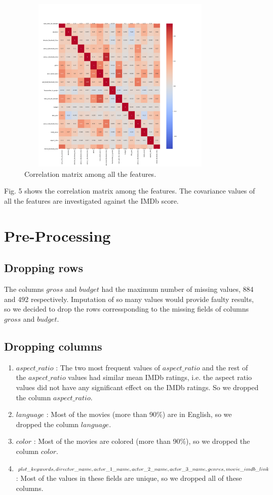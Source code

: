 \documentclass[conference]{IEEEtran}
\begin{document}
\begin{figure}[H]
  \centering	
  \captionsetup{justification=centering}
  \includegraphics[height=8.5cm, width=10cm, trim={20mm 20mm 20mm 40mm},clip]{../visualizations/corr_matrix.png}
  \caption{Correlation matrix among all the features.}
  \label{fig:fig5}
\end{figure}
Fig. 5 shows the correlation matrix among the features. The covariance values of all the features are investigated against the IMDb score.

\newpage
\section{Pre-Processing}
\subsection{Dropping rows}
The columns $gross$ and $budget$ had the maximum number of missing values, 884 and 492 respectively. Imputation of so many values would provide faulty results, so we decided to drop the rows corressponding to the missing fields of columns $gross$ and $budget$.
\subsection{Dropping columns}
	\begin{enumerate}
		\item $aspect\_ratio$ : The two most frequent values of $aspect\_ratio			$ and the rest of the $aspect\_ratio$ values had similar mean IMDb 				ratings, i.e. the aspect ratio values did not have any significant effect on the IMDb ratings. So we dropped the column $aspect\_ratio$.
		\item $language$ : Most of the movies (more than 90$\%$) are in 				English, so we dropped the column $language$.
		\item $color$ : Most of the movies are colored (more than 90$\%$), so 			we dropped the column $color$.
		\item $plot\_keywords, director\_name, actor\_1\_name, \\ actor					\_2\_name,			actor\_3\_name, genres,\\ movie\_imdb\_link$ : 				Most 			of the values in 				these fields are 				unique, so we dropped 		all of these columns.
	\end{enumerate}
\end{document}
